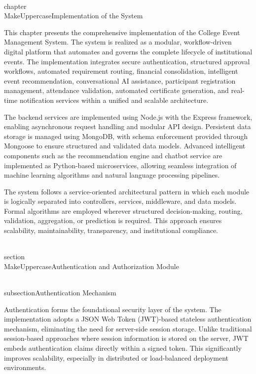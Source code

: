 \\chapter{\\MakeUppercase{Implementation of the System}}

This chapter presents the comprehensive implementation of the College Event Management System. The system is realized as a modular, workflow-driven digital platform that automates and governs the complete lifecycle of institutional events. The implementation integrates secure authentication, structured approval workflows, automated requirement routing, financial consolidation, intelligent event recommendation, conversational AI assistance, participant registration management, attendance validation, automated certificate generation, and real-time notification services within a unified and scalable architecture.

The backend services are implemented using Node.js with the Express framework, enabling asynchronous request handling and modular API design. Persistent data storage is managed using MongoDB, with schema enforcement provided through Mongoose to ensure structured and validated data models. Advanced intelligent components such as the recommendation engine and chatbot service are implemented as Python-based microservices, allowing seamless integration of machine learning algorithms and natural language processing pipelines.

The system follows a service-oriented architectural pattern in which each module is logically separated into controllers, services, middleware, and data models. Formal algorithms are employed wherever structured decision-making, routing, validation, aggregation, or prediction is required. This approach ensures scalability, maintainability, transparency, and institutional compliance.

\\section{\\MakeUppercase{Authentication and Authorization Module}}

\\subsection{Authentication Mechanism}

Authentication forms the foundational security layer of the system. The implementation adopts a JSON Web Token (JWT)-based stateless authentication mechanism, eliminating the need for server-side session storage. Unlike traditional session-based approaches where session information is stored on the server, JWT embeds authentication claims directly within a signed token. This significantly improves scalability, especially in distributed or load-balanced deployment environments.

